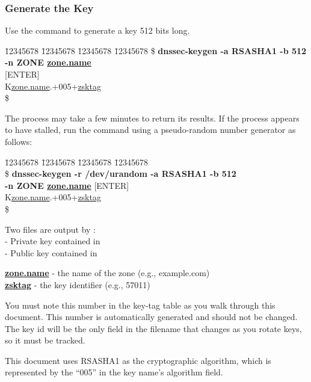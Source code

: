 
\subsubsection{Generate the Key}

Use the  command to generate a key 512 bits long. 
\begin{tabbing}
\hspace{0.5in} \= 12345678 \= 12345678 \= 12345678 \= 12345678 \kill
\hspace{0.5in}\$ {\bf dnssec-keygen -a RSASHA1 -b 512 -n ZONE \underline{zone.name}} \\
\hspace{0.5in} [ENTER] \\
\hspace{0.5in} K\underline{zone.name}.+005+\underline{zsktag} \\
\hspace{0.5in}\$ \\
\end{tabbing}

The process may take a few minutes to return its results. If the process
appears to have stalled, run the command using a pseudo-random number
generator as follows:
\begin{tabbing}
\hspace{0.5in} \= 12345678 \= 12345678 \= 12345678 \= 12345678 \kill \\
\hspace{0.5in}\$ {\bf dnssec-keygen -r /dev/urandom -a RSASHA1 -b 512} \\
\hspace{0.5in} {\bf -n ZONE \underline{zone.name}} [ENTER] \\
\hspace{0.5in} K\underline{zone.name}.+005+\underline{zsktag} \\
\hspace{0.5in}\$ \\
\end{tabbing}

Two files are output by : \\
    - Private key contained in \\
    - Public key contained in 

{\bf \underline{zone.name}} - the name of the zone (e.g., example.com)\\
{\bf \underline{zsktag}} - the key identifier (e.g., 57011) 

You must note this number in the key-tag table as you walk through this
document.  This number is automatically generated and should not be changed.
The key id will be the only field in the filename that changes as you rotate
keys, so it must be tracked.

This document uses RSASHA1 as the cryptographic algorithm, which is
represented by the ``005'' in the key name's algorithm field.

